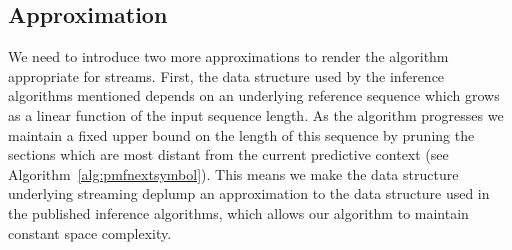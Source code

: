 
%
\subsection{Approximation}

We need to introduce two more approximations to render the algorithm appropriate for streams.  First, the data structure used by the inference algorithms mentioned depends on an underlying reference sequence which grows as a linear function of the input sequence length.  As the algorithm progresses we maintain a fixed upper bound on the length of this sequence by pruning the sections which are most distant from the current predictive context (see Algorithm~\ref{alg:pmfnextsymbol}).  This means we make the data structure underlying streaming deplump an approximation to the data structure used in the published inference algorithms, which allows our algorithm to maintain constant space complexity.

